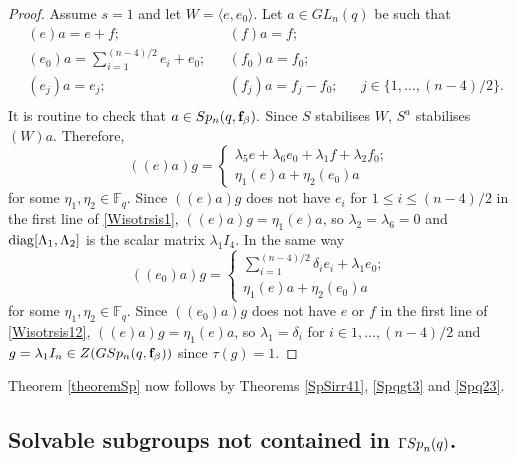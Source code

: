 \begin{proof}
Assume $s=1$ and let $W =\langle e,e_0 \rangle.$ Let $a \in GL_n(q)$  be such that 
\begin{equation*}
\begin{aligned}
&(e)a =e+ f; & & (f)a=f; \\
&(e_{0})a =\sum_{i=1}^{(n-4)/2} e_i + e_0;  & &(f_{0})a=f_{0};  &&   \\
&(e_{j})a =e_j;  & &(f_{j})a=f_{j} - f_0;  && j\in \{1, \ldots, (n-4)/2 \}.   \\
\end{aligned}
\end{equation*}
It is routine to check that $a \in Sp_n(q, {\bf f}_{\beta}).$   Since $S$ stabilises  $W$,  $S^a$ stabilises $(W)a.$ %
 Therefore, 
\begin{equation}\label{Wisotrsis1}
((e)a)g=
\begin{cases}
 \lambda_5 e+ \lambda_6 e_0 +\lambda_1 f + \lambda_2 f_0;\\
 \eta_1 (e)a + \eta_2 (e_0)a
\end{cases}
\end{equation}
for some $\eta_1, \eta_2\in \mathbb{F}_q.$ Since $((e)a)g$ does not have $e_i$ for $1 \le i  \le (n-4)/2$  in the first line of \eqref{Wisotrsis1}, $((e )a)g = \eta_1 (e )a$, so $\lambda_2=\lambda_6=0$ and $\mathrm{diag}[\Lambda_1, \Lambda_2]$ is the scalar matrix $\lambda_1 I_4.$ In the same way 
\begin{equation}\label{Wisotrsis12}
((e_0)a)g=
\begin{cases}
 \sum_{i=1}^{(n-4)/2} \delta_i e_i + \lambda_1 e_0;\\
 \eta_1 (e)a + \eta_2 (e_0)a
\end{cases}
\end{equation}
for some $\eta_1, \eta_2\in \mathbb{F}_q.$ Since $((e_0)a)g$ does not have $e$ or $f$  in the first line of \eqref{Wisotrsis12}, $((e )a)g = \eta_1 (e )a$, so 
$\lambda_1=\delta_i$ for $i \in {1, \ldots, (n-4)/2}$ and $g = \lambda_1 I_n \in Z(GSp_n(q, {\bf f}_{\beta}))$ since $\tau(g)=1.$
\end{proof}

Theorem \ref{theoremSp} now follows by Theorems \ref{SpSirr41}, \ref{Spqgt3} and \ref{Spq23}.

\subsection{Solvable subgroups not contained in ${{\Gamma Sp}}_n(q)$.}
\label{sec432}

